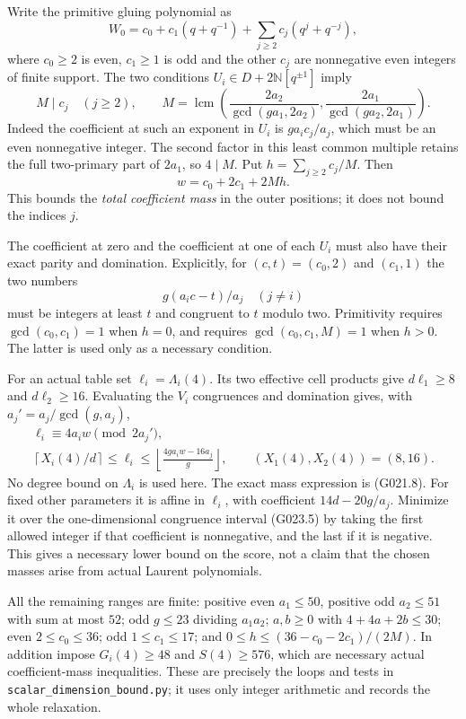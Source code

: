 Write the primitive gluing polynomial as
\[
 W_0=c_0+c_1(q+q^{-1})+
          \sum_{j\ge2}c_j(q^j+q^{-j}),
\]
where $c_0\ge2$ is even, $c_1\ge1$ is odd and the other
$c_j$ are nonnegative even integers of finite support.
The two conditions $U_i\in D+2\mathbb N[q^{\pm1}]$ imply
\[
 M\mid c_j\quad(j\ge2),\qquad
 M=\operatorname{lcm}\left(
 \frac{2a_2}{\gcd(ga_1,2a_2)},
 \frac{2a_1}{\gcd(ga_2,2a_1)}\right).
 \tag{G023.2}
\]
Indeed the coefficient at such an exponent in $U_i$ is
$ga_ic_j/a_j$, which must be an even nonnegative integer.
The second factor in this least common multiple retains
the full two-primary part of $2a_1$, so $4\mid M$.
Put $h=\sum_{j\ge2}c_j/M$. Then
\[
 w=c_0+2c_1+2Mh.                                     \tag{G023.3}
\]
This bounds the \emph{total coefficient mass} in the outer
positions; it does not bound the indices $j$.

The coefficient at zero and the coefficient at one of each
$U_i$ must also have their exact parity and domination.
Explicitly, for $(c,t)=(c_0,2)$ and $(c_1,1)$ the two numbers
\[
 g(a_ic-t)/a_j\quad(j\ne i)
 \tag{G023.4}
\]
must be integers at least $t$ and congruent to $t$ modulo two.
Primitivity requires $\gcd(c_0,c_1)=1$ when $h=0$, and
requires $\gcd(c_0,c_1,M)=1$ when $h>0$. The latter is
used only as a necessary condition.

For an actual table set $\ell_i=\Lambda_i(4)$. Its two
effective cell products give $d\ell_1\ge8$ and
$d\ell_2\ge16$. Evaluating the $V_i$ congruences and
domination gives, with $a_j'=a_j/\gcd(g,a_j)$,
\[
 \begin{gathered}
 \ell_i\equiv4a_iw\pmod{2a_j'},\\
 \left\lceil X_i(4)/d\right\rceil\le\ell_i\le
 \left\lfloor\frac{4ga_iw-16a_j}{g}\right\rfloor,
 \qquad (X_1(4),X_2(4))=(8,16).
 \end{gathered}                                       \tag{G023.5}
\]
No degree bound on $\Lambda_i$ is used here.
The exact mass expression is (G021.8). For fixed other
parameters it is affine in $\ell_i$, with coefficient
$14d-20g/a_j$. Minimize it over the one-dimensional
congruence interval (G023.5) by taking the first allowed
integer if that coefficient is nonnegative, and the last
if it is negative. This gives a necessary lower bound on
the score, not a claim that the chosen masses arise from
actual Laurent polynomials.

All the remaining ranges are finite: positive even
$a_1\le50$, positive odd $a_2\le51$ with sum at most $52$;
odd $g\le23$ dividing $a_1a_2$; $a,b\ge0$ with
$4+4a+2b\le30$; even $2\le c_0\le36$; odd
$1\le c_1\le17$; and $0\le h\le(36-c_0-2c_1)/(2M)$.
In addition impose $G_i(4)\ge48$ and $S(4)\ge576$,
which are necessary actual coefficient-mass inequalities.
These are precisely the loops and tests in
\texttt{scalar\_dimension\_bound.py}; it uses only integer
arithmetic and records the whole relaxation.

